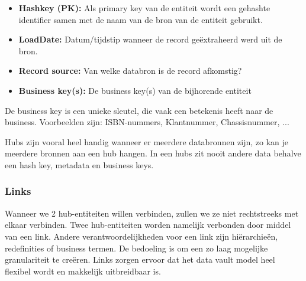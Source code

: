\begin{itemize}
	\item \textbf{Hashkey (PK):} Als primary key van de entiteit wordt een gehashte identifier samen met de naam van de bron van de entiteit gebruikt.
	\item \textbf{LoadDate:} Datum/tijdstip wanneer de record geëxtraheerd werd uit de bron.
	\item \textbf{Record source:} Van welke databron is de record afkomstig?
	\item \textbf{Business key(s):} De business key(s) van de bijhorende entiteit
\end{itemize} 

 De business key is een unieke sleutel, die vaak een betekenis heeft naar de business. Voorbeelden zijn: ISBN-nummers, Klantnummer, Chassisnummer, ...
 
 Hubs zijn vooral heel handig wanneer er meerdere databronnen zijn, zo kan je meerdere bronnen aan een hub hangen. In een hubs zit nooit andere data behalve een hash key, metadata en business keys.

\subsubsection{Links}
Wanneer we 2 hub-entiteiten willen verbinden, zullen we ze niet rechtstreeks met elkaar verbinden. Twee hub-entiteiten worden namelijk verbonden door middel van een link. Andere verantwoordelijkheden voor een link zijn hiërarchieën, redefinities of business termen. De bedoeling is om een zo laag mogelijke granulariteit te creëren. Links zorgen ervoor dat het data vault model heel flexibel wordt en makkelijk uitbreidbaar is. 

